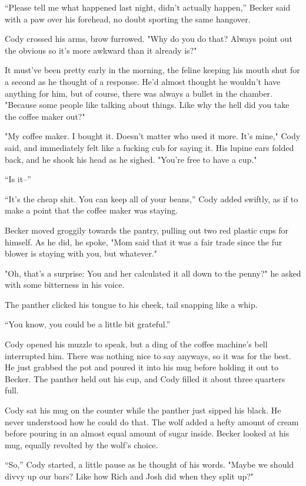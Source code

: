 ``Please tell me what happened last night, didn't actually happen,''
Becker said with a paw over his forehead, no doubt sporting the same
hangover.

Cody crossed his arms, brow furrowed. "Why do you do that? Always point
out the obvious so it's more awkward than it already is?"

It must've been pretty early in the morning, the feline keeping his
mouth shut for a second as he thought of a response. He'd almost thought
he wouldn't have anything for him, but of course, there was always a
bullet in the chamber. "Because some people like talking about things.
Like why the hell did you take the coffee maker out?"

"My coffee maker. I bought it. Doesn't matter who used it more. It's
mine," Cody said, and immediately felt like a fucking cub for saying it.
His lupine ears folded back, and he shook his head as he sighed. "You're
free to have a cup."

``Is it--''

``It's the cheap shit. You can keep all of your beans,'' Cody added
swiftly, as if to make a point that the coffee maker was staying.

Becker moved groggily towards the pantry, pulling out two red plastic
cups for himself. As he did, he spoke, "Mom said that it was a fair
trade since the fur blower is staying with you, but whatever."

"Oh, that's a surprise: You and her calculated it all down to the
penny?" he asked with some bitterness in his voice.

The panther clicked his tongue to his cheek, tail snapping like a whip.

``You know, you could be a little bit grateful.''

Cody opened his muzzle to speak, but a ding of the coffee machine's bell
interrupted him. There was nothing nice to say anyways, so it was for
the best. He just grabbed the pot and poured it into his mug before
holding it out to Becker. The panther held out his cup, and Cody filled
it about three quarters full.

Cody sat his mug on the counter while the panther just sipped his black.
He never understood how he could do that. The wolf added a hefty amount
of cream before pouring in an almost equal amount of sugar inside.
Becker looked at his mug, equally revolted by the wolf's choice.

``So,'' Cody started, a little pause as he thought of his words. "Maybe we
should divvy up our bars? Like how Rich and Josh did when they split
up?"

